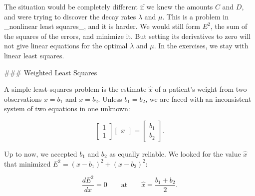 The situation would be completely different if we knew the amounts \(C\) and \(D\), and were trying to discover the decay rates \(\lambda\) and \(\mu\). This is a problem in _nonlinear least squares_, and it is harder. We would still form \(E^{2}\), the sum of the squares of the errors, and minimize it. But setting its derivatives to zero will not give linear equations for the optimal \(\lambda\) and \(\mu\). In the exercises, we stay with linear least squares.

### Weighted Least Squares

A simple least-squares problem is the estimate \(\widehat{x}\) of a patient's weight from two observations \(x=b_{1}\) and \(x=b_{2}\). Unless \(b_{1}=b_{2}\), we are faced with an inconsistent system of two equations in one unknown:

\[\begin{bmatrix}1\\ 1\end{bmatrix}\begin{bmatrix}x\end{bmatrix}=\begin{bmatrix}b_{1}\\ b_{2}\end{bmatrix}.\]

Up to now, we accepted \(b_{1}\) and \(b_{2}\) as equally reliable. We looked for the value \(\widehat{x}\) that minimized \(E^{2}=(x-b_{1})^{2}+(x-b_{2})^{2}\):

\[\frac{dE^{2}}{dx}=0\qquad\text{at}\qquad\widehat{x}=\frac{b_{1}+b_{2}}{2}.\] 